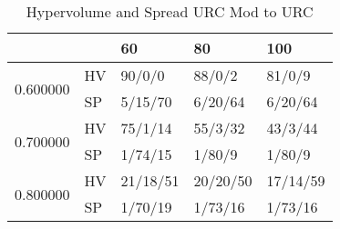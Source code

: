 \begin{table}
\caption{Hypervolume and Spread URC Mod to URC}
\begin{tabular}{lllll}
\toprule
 &  & 60 & 80 & 100 \\
\midrule
\multirow[t]{2}{*}{0.600000} & HV & 90/0/0 & 88/0/2 & 81/0/9 \\
 & SP & 5/15/70 & 6/20/64 & 6/20/64 \\
\cline{1-5}
\multirow[t]{2}{*}{0.700000} & HV & 75/1/14 & 55/3/32 & 43/3/44 \\
 & SP & 1/74/15 & 1/80/9 & 1/80/9 \\
\cline{1-5}
\multirow[t]{2}{*}{0.800000} & HV & 21/18/51 & 20/20/50 & 17/14/59 \\
 & SP & 1/70/19 & 1/73/16 & 1/73/16 \\
\cline{1-5}
\bottomrule
\end{tabular}
\end{table}
